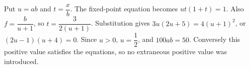 Put $u=ab$ and $t=\dfrac{x}{b}$. The fixed-point equation becomes $ut(1+t)=1$. Also $f=\dfrac{b}{u+1}$, so $t=\dfrac{3}{2(u+1)}$. Substitution gives $3u(2u+5)=4(u+1)^2$, or $(2u-1)(u+4)=0$. Since $u>0$, $u=\dfrac{1}{2}$, and $\boxed{100ab=50}$. Conversely this positive value satisfies the equations, so no extraneous positive value was introduced.
